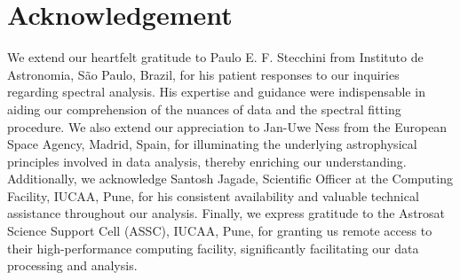 \section*{Acknowledgement}
	We extend our heartfelt gratitude to Paulo E. F. Stecchini from Instituto de Astronomia, S\~{a}o Paulo, Brazil, for his patient responses to our inquiries regarding spectral analysis. His expertise and guidance were indispensable in aiding our comprehension of the nuances of data and the spectral fitting procedure. We also extend our appreciation to Jan-Uwe Ness from the European Space Agency, Madrid, Spain, for illuminating the underlying astrophysical principles involved in data analysis, thereby enriching our understanding. Additionally, we acknowledge Santosh Jagade, Scientific Officer at the Computing Facility, IUCAA, Pune, for his consistent availability and valuable technical assistance throughout our analysis. Finally, we express gratitude to the Astrosat Science Support Cell (ASSC), IUCAA, Pune, for granting us remote access to their high-performance computing facility, significantly facilitating our data processing and analysis.